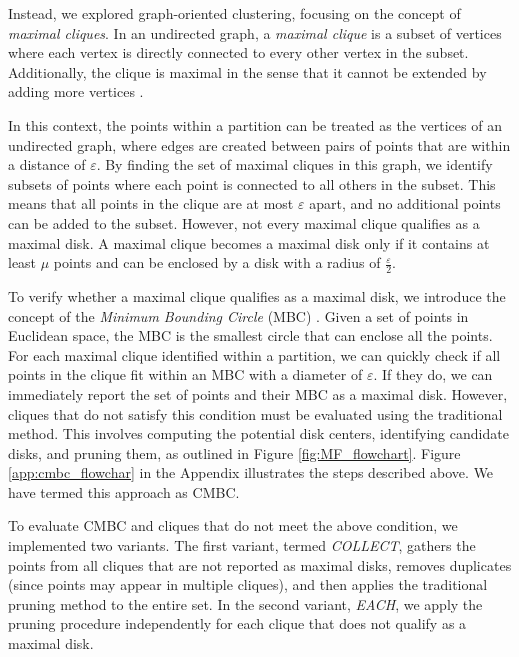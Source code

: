 Instead, we explored graph-oriented clustering, focusing on the concept of \textit{maximal cliques}. In an undirected graph, a \textit{maximal clique} is a subset of
vertices where each vertex is directly connected to every other vertex in the subset. Additionally, the clique is maximal in the sense that it cannot be 
extended by adding more vertices \cite{tomita_clique_2013, bron_algorithm_1973}.

In this context, the points within a partition can be treated as the vertices of an undirected graph, where edges are created between pairs of points that are 
within a distance of $\varepsilon$. By finding the set of maximal cliques in this graph, we identify subsets of points where each point is connected to all 
others in the subset. This means that all points in the clique are at most $\varepsilon$ apart, and no additional points can be added to the subset.
However, not every maximal clique qualifies as a maximal disk. A maximal clique becomes a maximal disk only if it contains at least $\mu$ points and can be 
enclosed by a disk with a radius of $\frac{\varepsilon}{2}$.

To verify whether a maximal clique qualifies as a maximal disk, we introduce the concept of the \textit{Minimum Bounding Circle} (MBC) \cite{welzl_mbc_1991}. 
Given a set of points in Euclidean space, the MBC is the smallest circle that can enclose all the points. For each maximal clique identified within a partition, 
we can quickly check if all points in the clique fit within an MBC with a diameter of $\varepsilon$. If they do, we can immediately report the set of points and 
their MBC as a maximal disk.  However, cliques that do not satisfy this condition must be evaluated using the traditional method. This involves computing the 
potential disk centers, identifying candidate disks, and pruning them, as outlined in Figure \ref{fig:MF_flowchart}. Figure \ref{app:cmbc_flowchar} in the Appendix illustrates the steps described above.  We have termed this approach as CMBC.

To evaluate CMBC and cliques that do not meet the above condition, we implemented two variants. The first variant, termed \textit{COLLECT}, gathers the points from
all cliques that are not reported as maximal disks, removes duplicates (since points may appear in multiple cliques), and then applies the traditional pruning 
method to the entire set. In the second variant, \textit{EACH}, we apply the pruning procedure independently for each clique that does not qualify as a maximal 
disk.

